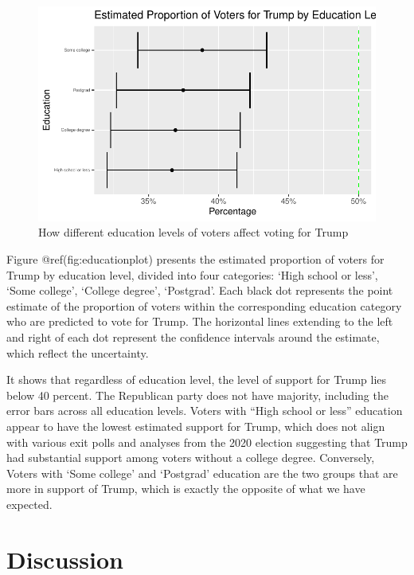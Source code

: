 \documentclass[
  letterpaper,
  DIV=11,
  numbers=noendperiod]{scrartcl}
\begin{document}
\begin{figure}

{\centering \includegraphics{paper_files/figure-pdf/educationplot-1.pdf}

}

\caption{How different education levels of voters affect voting for
Trump}

\end{figure}

Figure @ref(fig:educationplot) presents the estimated proportion of
voters for Trump by education level, divided into four categories: `High
school or less', `Some college', `College degree', `Postgrad'. Each
black dot represents the point estimate of the proportion of voters
within the corresponding education category who are predicted to vote
for Trump. The horizontal lines extending to the left and right of each
dot represent the confidence intervals around the estimate, which
reflect the uncertainty.

It shows that regardless of education level, the level of support for
Trump lies below 40 percent. The Republican party does not have
majority, including the error bars across all education levels. Voters
with ``High school or less'' education appear to have the lowest
estimated support for Trump, which does not align with various exit
polls and analyses from the 2020 election suggesting that Trump had
substantial support among voters without a college degree. Conversely,
Voters with `Some college' and `Postgrad' education are the two groups
that are more in support of Trump, which is exactly the opposite of what
we have expected.

\hypertarget{discussion}{%
\section{Discussion}\label{discussion}}
\end{document}
